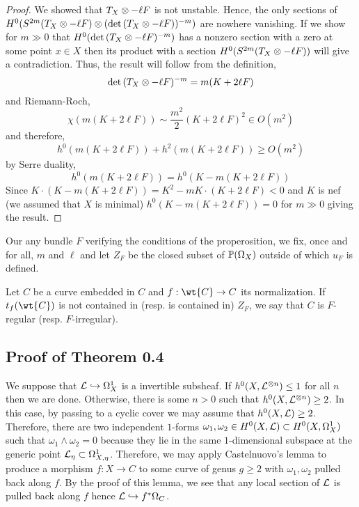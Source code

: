 \documentclass[12pt]{article}
\begin{document}
\begin{proof}
We showed that $T_X \ot -\ell F$ is not unstable. Hence, the only sections of $H^0(S^{2m}(T_X \ot -\ell F) \ot (\det{(T_X \ot -\ell F)})^{-m})$ are nowhere vanishing. If we show for $m \gg 0$ that $H^0(\det{(T_X \ot - \ell F})^{-m})$ has a nonzero section with a zero at some point $x \in X$ then its product with a section $H^0(S^{2m}(T_X \ot - \ell F))$ will give a contradiction.
Thus, the result will follow from the definition,
\[ \det{(T_X \ot - \ell F)^{-m}} = m (K + 2 \ell F) \]
and Riemann-Roch,
\[ \chi(m(K + 2 \ell F)) \sim \frac{m^2}{2} (K + 2 \ell F)^2 \in O(m^2) \]
and therefore,
\[ h^0(m(K + 2 \ell F)) + h^2(m(K + 2 \ell F)) \ge O(m^2) \]
by Serre duality,
\[ h^0(m(K + 2 \ell F)) = h^0(K - m(K + 2 \ell F)) \]
Since $K \cdot (K - m(K + 2 \ell F)) = K^2 - m K \cdot (K + 2 \ell F) < 0$ and $K$ is nef (we assumed that $X$ is minimal) $h^0(K - m (K + 2 \ell F)) = 0$ for $m \gg 0$ giving the result.
\end{proof}

Our any bundle $F$ verifying the conditions of the properosition, we fix, once and for all, $m$ and $\ell$ and let $Z_F$ be the closed subset of $\P(\Omega_X)$ outside of which $u_F$ is defined.

\begin{defn}
Let $C$ be a curve embedded in $C$ and $f : \wt{C} \to C$ its normalization. If $t_f(\wt{C})$ is not contained in (resp. is contained in) $Z_F$, we say that $C$ is $F$-regular (resp. $F$-irregular).
\end{defn}

\subsection{Proof of Theorem 0.4}

We suppose that $\L \embed \Omega_X^1$ is a invertible subsheaf. If $h^0(X, \L^{\ot n}) \le 1$ for all $n$ then we are done. Otherwise, there is some $n > 0$ such that $h^0(X, \L^{\ot n}) \ge 2$. In this case, by passing to a cyclic cover we may assume that $h^0(X, \L) \ge 2$. Therefore, there are two independent $1$-forms $\omega_1, \omega_2 \in H^0(X, \L) \subset H^0(X, \Omega^1_X)$ such that $\omega_1 \wedge \omega_2 = 0$ because they lie in the same $1$-dimensional subspace at the generic point $\L_{\eta} \subset \Omega_{X, \eta}^1$. Therefore, we may apply Castelnuovo's lemma to produce a morphism $f : X \to C$ to some curve of genus $g \ge 2$ with $\omega_1, \omega_2$ pulled back along $f$. By the proof of this lemma, we see that any local section of $\L$ is pulled back along $f$ hence $\L \embed f^* \Omega_C$.  
\end{document}
